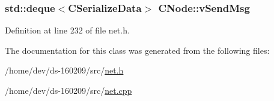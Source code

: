 \subsubsection[{v\+Send\+Msg}]{\setlength{\rightskip}{0pt plus 5cm}std\+::deque$<${\bf C\+Serialize\+Data}$>$ C\+Node\+::v\+Send\+Msg}\label{class_c_node_a68e5fb1a80fe4247aa577a3c9a74b399}


Definition at line 232 of file net.\+h.



The documentation for this class was generated from the following files\+:\begin{DoxyCompactItemize}
\item 
/home/dev/ds-\/160209/src/\hyperlink{net_8h}{net.\+h}\item 
/home/dev/ds-\/160209/src/\hyperlink{net_8cpp}{net.\+cpp}\end{DoxyCompactItemize}
